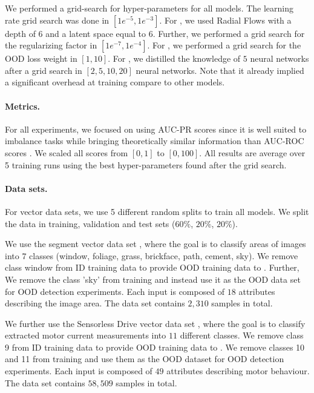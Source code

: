 We performed a grid-search for hyper-parameters for all models. The learning rate grid search was done in $[1e^{-5}, 1e^{-3}]$. For \PostNet, we used Radial Flows with a depth of 6 and a latent space equal to 6. Further, we performed a grid search for the regularizing factor in $[1e^{-7}, 1e^{-4}]$. For \PriorNet, we performed a grid search for the OOD loss weight in $[1, 10]$. For \DDNet, we distilled the knowledge of $5$ neural networks after a grid search in $[2, 5, 10, 20]$ neural networks. Note that it already implied a significant overhead at training compare to other models.

\paragraph{Metrics.} For all experiments, we focused on using AUC-PR scores since it is well suited to imbalance tasks \citep{imbalance_apr} while bringing theoretically similar information than AUC-ROC scores \citep{apr_auroc}. We scaled all scores from $[0, 1]$ to $[0, 100]$. All results are average over 5 training runs using the best hyper-parameters found after the grid search.

\paragraph{Data sets.} For vector data sets, we use 5 different random splits to train all models. We split the data in training, validation and test sets ($60\%$, $20\%$, $20\%$). 

We use the segment vector data set \cite{uci_datasets}, where the goal is to classify areas of images into $7$ classes (window, foliage, grass, brickface, path, cement, sky). We remove class window from ID training data to provide OOD training data to \PriorNet. Further, We remove the class 'sky' from training and instead use it as the OOD data set for OOD detection experiments. Each input is composed of $18$ attributes describing the image area. The data set contains $2,310$ samples in total.

We further use the Sensorless Drive vector data set \cite{uci_datasets}, where the goal is to classify extracted motor current measurements into $11$ different classes. We remove class 9 from ID training data to provide OOD training data to \PriorNet. We remove classes 10 and 11 from training and use them as the OOD dataset for OOD detection experiments. Each input is composed of $49$ attributes describing motor behaviour. The data set contains $58,509$ samples in total.

